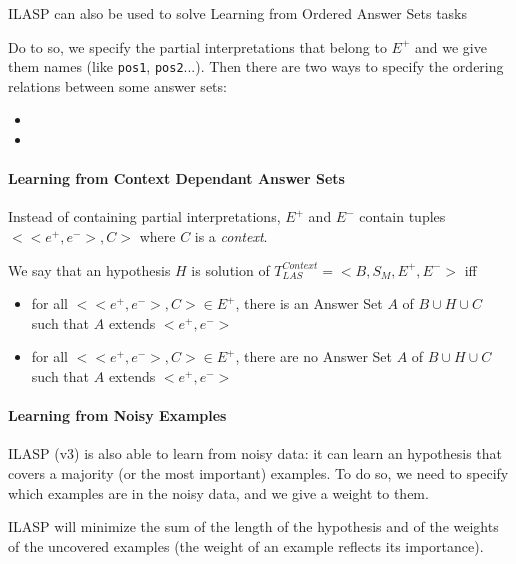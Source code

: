 ILASP can also be used to solve Learning from Ordered Answer Sets tasks


\smallskip

Do to so, we specify the partial interpretations that belong to $E^+$ and we give them names (like \texttt{pos1}, \texttt{pos2}...). Then there are two ways to specify the ordering relations between some answer sets:
\begin{itemize}
\item 
\item 
\end{itemize}

\paragraph{Learning from Context Dependant Answer Sets} 

Instead of containing partial interpretations, $E^+$ and $E^-$ contain tuples $<<e^+,e^->,C>$ where $C$ is a \textit{context}. 

\smallskip

We say that an hypothesis $H$ is solution of $T^{Context}_{LAS}=<B,S_M,E^+,E^->$ iff
\begin{itemize}
\item for all $<< e^+ , e^->, C >\in E^+$, there is an Answer Set $A$ of $B \cup H \cup C$ such that $A$ extends $< e^+ , e^- >$


\item for all $<< e^+ , e^->, C >\in E^+$, there are no Answer Set $A$ of $B \cup H \cup C$ such that $A$ extends $< e^+ , e^- >$

\end{itemize}

\paragraph{Learning from Noisy Examples}

ILASP (v3) is also able to learn from noisy data: it can learn an hypothesis that covers a majority (or the most important) examples. To do so, we need to specify which examples are in the noisy data, and we give a weight to them. 

\smallskip

ILASP will minimize the sum of the length of the hypothesis and of the weights of the uncovered examples (the weight of an example reflects its importance).



